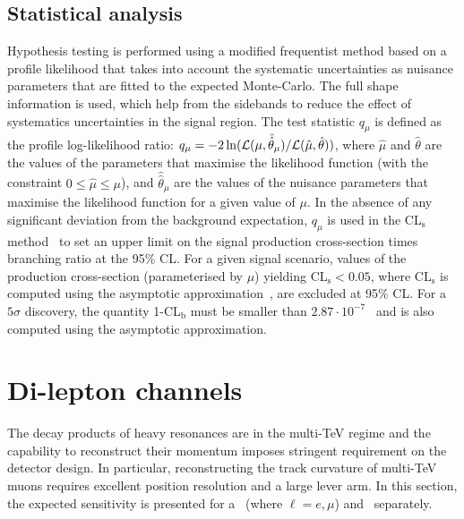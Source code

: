 \documentclass[a4paper,11pt]{article}
\begin{document}
\subsection{Statistical analysis}
Hypothesis testing is performed using a modified frequentist method based on a profile likelihood that takes into account the systematic uncertainties as nuisance parameters that are fitted to the expected Monte-Carlo. The full shape information is used, which help from the sidebands to reduce the effect of systematics uncertainties in the signal region. The test statistic $q_\mu$ is defined as the profile log-likelihood ratio: $q_\mu = -2\ln({\cal L}(\mu,\hat{\hat{\theta}}_\mu)/{\cal L}(\hat{\mu},\hat{\theta}))$, where $\hat{\mu}$ and $\hat{\theta}$ are the values of the parameters that maximise the likelihood function (with the constraint $0\leq \hat{\mu} \leq \mu$), and $\hat{\hat{\theta}}_\mu$ are the values of the nuisance parameters that maximise the likelihood function for a given value of $\mu$. In the absence of any significant deviation from the background expectation, $q_\mu$ is used in the CL$_\text{s}$ method~\cite{Junk:1999kv,Read:2002hq} to set an upper limit on the signal production cross-section times branching ratio at the 95\% CL. For a given signal scenario, values of the production cross-section (parameterised by $\mu$) yielding CL$_\text{s} < 0.05$, where CL$_\text{s}$ is computed using the asymptotic approximation~\cite{Cowan:2010js}, are excluded at 95\% CL. For a $5\sigma$ discovery, the quantity 1-CL$_\text{b}$ must be smaller than $2.87 \cdot 10^{-7}$~\cite{Junk:1999kv} and is also computed using the asymptotic approximation.



\section{Di-lepton channels}
\label{sec:lep}

The decay products of heavy resonances are in the multi-TeV regime and the capability to reconstruct their momentum imposes stringent requirement on the detector design. In particular, reconstructing the track curvature of multi-TeV muons requires excellent position resolution and a large lever arm. In this section, the expected sensitivity is presented for a \Zpll\ (where $\ell=e,\mu$) and \Zptata\ separately.

\end{document}

